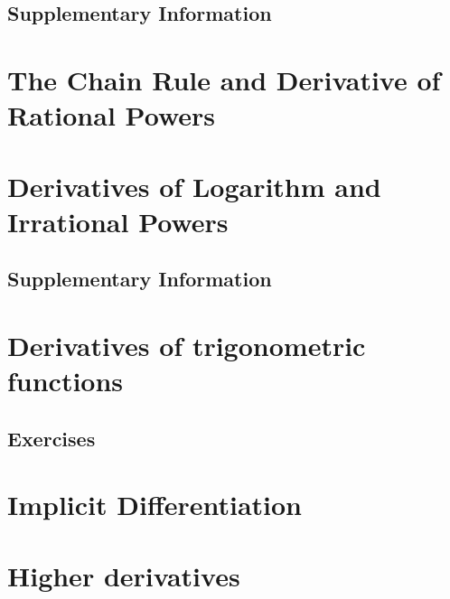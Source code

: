 \documentclass{fts_m2}
\begin{document}
    \subsection*{Supplementary Information}
    
    \fi

    \section{The Chain Rule and Derivative of Rational Powers}
    

    \section{Derivatives of Logarithm and Irrational Powers}
    
    \ifcompilesupp
    \subsection*{Supplementary Information}
    
    \fi
    
    \section{Derivatives of trigonometric functions}
    
    \ifcompilesupp
    \subsection*{Exercises}
    
    \fi
    
    \section{Implicit Differentiation}
    

    \section{Higher derivatives}
    
\end{document}
